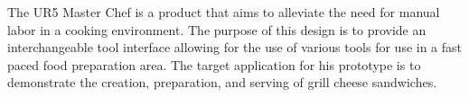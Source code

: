 The UR5 Master Chef is a product that aims to alleviate the need for manual labor in a cooking environment.  The purpose of this design is to provide an interchangeable tool interface allowing for the use of various tools for use in a fast paced food preparation area. The target application for his prototype is to demonstrate the creation, preparation, and serving of grill cheese sandwiches.